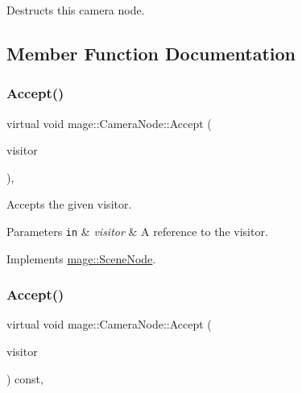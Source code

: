 Destructs this camera node. 

\subsection{Member Function Documentation}
\hypertarget{classmage_1_1_camera_node_aed9c3c12cc4163fed880c49e43380efe}{}\label{classmage_1_1_camera_node_aed9c3c12cc4163fed880c49e43380efe} 
\subsubsection{\texorpdfstring{Accept()}{Accept()}\hspace{0.1cm}{\footnotesize\ttfamily [1/2]}}
{\footnotesize\ttfamily virtual void mage\+::\+Camera\+Node\+::\+Accept (\begin{DoxyParamCaption}\item[{\hyperlink{classmage_1_1_scene_node_visitor}{Scene\+Node\+Visitor} \&}]{visitor }\end{DoxyParamCaption})\hspace{0.3cm}{\ttfamily [override]}, {\ttfamily [virtual]}}

Accepts the given visitor.


\begin{DoxyParams}[1]{Parameters}
\mbox{\tt in}  & {\em visitor} & A reference to the visitor. \\
\hline
\end{DoxyParams}


Implements \hyperlink{classmage_1_1_scene_node_a32ed8763c8f8b4caa155f64551d96f13}{mage\+::\+Scene\+Node}.

\hypertarget{classmage_1_1_camera_node_a8b94f57b3a04f70b2c04a3d7c1ba3082}{}\label{classmage_1_1_camera_node_a8b94f57b3a04f70b2c04a3d7c1ba3082} 
\subsubsection{\texorpdfstring{Accept()}{Accept()}\hspace{0.1cm}{\footnotesize\ttfamily [2/2]}}
{\footnotesize\ttfamily virtual void mage\+::\+Camera\+Node\+::\+Accept (\begin{DoxyParamCaption}\item[{\hyperlink{classmage_1_1_scene_node_visitor}{Scene\+Node\+Visitor} \&}]{visitor }\end{DoxyParamCaption}) const\hspace{0.3cm}{\ttfamily [override]}, {\ttfamily [virtual]}}

